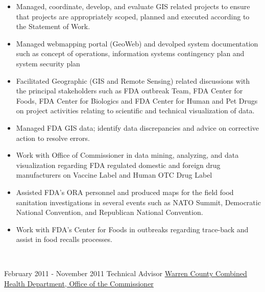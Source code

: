 \documentclass[letterpaper]{twentysecondcv} %
\begin{document}
\begin{twenty}
{{\begin{itemize}
\item	Managed, coordinate, develop, and evaluate GIS related projects to ensure that projects are appropriately scoped, planned and executed according to the Statement of Work. 
\vspace{1mm}
\item	Managed webmapping portal (GeoWeb) and devolped system documentation such as concept of operations, information systems contingency plan and system security plan
\vspace{1mm}
\item	Facilitated Geographic (GIS and Remote Sensing) related discussions with the principal stakeholders such as FDA outbreak Team, FDA Center for Foods, FDA Center for Biologics and FDA Center for Human and Pet Drugs on project activities relating to scientific and technical visualization of data.
\vspace{1mm}
\item	Managed FDA GIS data; identify data discrepancies and advice on corrective action to resolve errors.
\vspace{1mm}
\item	Work with Office of Commissioner in data mining, analyzing, and data visualization regarding FDA regulated domestic and foreign drug manufacturers on Vaccine Label and Human OTC Drug Label 
\vspace{1mm} 
\item	Assisted FDA's ORA personnel and produced maps for the field food sanitation investigations in several events such as NATO Summit, Democratic National Convention, and Republican National Convention. 
\vspace{1mm}
\item	Work with FDA’s Center for Foods in outbreaks regarding trace-back and assist in food recalls processes. 
	
            \end{itemize}}
        }
     \\
     \end{twenty}
\begin{twenty}
 \twentyitem
    	{February  2011 -}
		{November 2011}
        {Technical Advisor}        
        {\href{http://www.co.warren.oh.us/}{Warren County Combined Health Department, Office of the Commissioner}}

\\
        {}
 \end{twenty}
\end{document}
